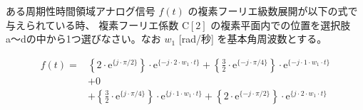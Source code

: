 ある周期性時間領域アナログ信号 $f(t)$ の複素フーリエ級数展開が以下の式で与えられている時、
複素フーリエ係数 $\textrm{C}[2]$ の複素平面内での位置を選択肢a〜dの中から1つ選びなさい。なお $w_1$ [rad/秒] を基本角周波数とする。

\begin{align*}
f(t) =
&  \left \{ 2 \cdot \textrm{e}^{\{ j \cdot \pi/2 \}} \right \} \cdot \textrm{e}^{\{-j \cdot  2 \cdot w_1 \cdot t \}}
 + \left \{ \frac{3}{2} \cdot \textrm{e}^{\{-j \cdot \pi/4 \}} \right \} \cdot \textrm{e}^{\{-j \cdot  1 \cdot w_1 \cdot t \}} \\
&+ 0 \\
&+ \left \{ \frac{3}{2} \cdot \textrm{e}^{\{ j \cdot \pi/4 \}} \right \} \cdot \textrm{e}^{\{ j \cdot 1 \cdot w_1 \cdot t \}} 
 + \left \{ 2 \cdot \textrm{e}^{\{-j \cdot \pi/2 \}} \right \} \cdot \textrm{e}^{\{ j \cdot 2 \cdot w_1 \cdot t \}} 
\end{align*}
